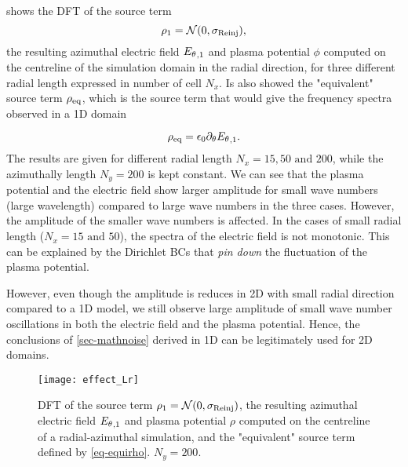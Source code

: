        shows the \ac{DFT} of the source term \[\rho_1 = \mathcal{N}(0, \sigma_{\rm Reinj}),\] the resulting azimuthal electric field ${E_{\theta}}_{, 1}$ and plasma potential $\phi$ computed on the centreline of the simulation domain in the radial direction, for three different radial length expressed in number of cell $N_x$.
      Is also showed the "equivalent" source term $\rho_{\rm eq}$, which is the source term that would give the frequency spectra observed in a \ac{1D} domain
      
      \begin{equation} \label{eq-equirho}
        \rho_{\rm eq} = \epsilon_0 \partial_\theta {\ensuremath{E_{\theta}}}_{, 1}.
      \end{equation}
      The results are given for different radial length $N_x=15,50 \text{ and } 200$, while the azimuthally length $N_y=200$ is kept constant.
      We can see that the plasma potential and the electric field show larger amplitude for small wave numbers (large wavelength) compared to large wave numbers in the three cases.
      However, the amplitude of the smaller wave numbers is affected.
      In the cases of small radial length ($N_x=15 \text{ and } 50$), the spectra of the electric field is not monotonic.
      This can be explained by the Dirichlet \ac{BC}s that {\it pin down} the fluctuation of the plasma potential.
      
      However, even though the amplitude is reduces in \ac{2D} with small radial direction compared to a \ac{1D} model, we still observe large amplitude of small wave number oscillations in both the electric field and the plasma potential.
      Hence, the conclusions of  \cref{sec-mathnoise} derived in \ac{1D} can be legitimately used for \ac{2D} domains.
      
      
      
      \begin{figure}[hbtp]
        \centering
        \texttt{[image: effect\_Lr]}
        \caption{\ac{DFT} of the source term $\rho_1 = \mathcal{N}(0, \sigma_{\rm Reinj})$, the resulting azimuthal electric field ${E_{\theta}}_{, 1}$ and plasma potential $\rho$ computed on the centreline of a radial-azimuthal simulation, and the "equivalent" source term defined by \cref{eq-equirho}. $N_y=200$. }
        \label{fig-dftLr}
      \end{figure}
      
      





